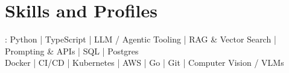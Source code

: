 \documentclass[]{jack-resume}
\begin{document}
\pagecolor{darkmodeBackground}

%
%



%
%
\begin{minipage}[t][1cm][t]{.03\textwidth}
    \hfill
\end{minipage}






\section{Skills and Profiles}
:
Python \hfill | \hfill
TypeScript \hfill | \hfill
LLM / Agentic Tooling \hfill | \hfill
RAG \& Vector Search \hfill | \hfill
Prompting \& APIs \hfill | \hfill
SQL \hfill | \hfill
Postgres \\
\hspace{1.0cm} Docker \hfill | \hfill
CI/CD \hfill | \hfill
Kubernetes \hfill | \hfill
AWS \hfill | \hfill
Go \hfill | \hfill
Git \hfill | \hfill
Computer Vision / VLMs \\
\end{document}
